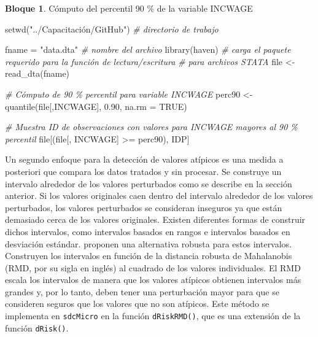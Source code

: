 \documentclass[
]{book}
\newenvironment{Shaded}{\begin{snugshade}}{\end{snugshade}}
\newcommand{\AttributeTok}[1]{\textcolor[rgb]{0.77,0.63,0.00}{#1}}
\newcommand{\CommentTok}[1]{\textcolor[rgb]{0.56,0.35,0.01}{\textit{#1}}}
\newcommand{\ConstantTok}[1]{\textcolor[rgb]{0.00,0.00,0.00}{#1}}
\newcommand{\FloatTok}[1]{\textcolor[rgb]{0.00,0.00,0.81}{#1}}
\newcommand{\FunctionTok}[1]{\textcolor[rgb]{0.00,0.00,0.00}{#1}}
\newcommand{\NormalTok}[1]{#1}
\newcommand{\OtherTok}[1]{\textcolor[rgb]{0.56,0.35,0.01}{#1}}
\newcommand{\SpecialCharTok}[1]{\textcolor[rgb]{0.00,0.00,0.00}{#1}}
\newcommand{\StringTok}[1]{\textcolor[rgb]{0.31,0.60,0.02}{#1}}
\theoremstyle{definition}
\theoremstyle{definition}
\newtheorem{example}{Bloque}[chapter]
\theoremstyle{definition}
\theoremstyle{definition}
\theoremstyle{remark}
\begin{document}
\begin{example}
\protect\hypertarget{exm:bloqueMR8}{}\label{exm:bloqueMR8}Cómputo del percentil 90 \% de la variable INCWAGE
\end{example}

\begin{Shaded}
\begin{Highlighting}[]
\FunctionTok{setwd}\NormalTok{(}\StringTok{"../Capacitación/GitHub"}\NormalTok{) }\CommentTok{\# directorio de trabajo}

\NormalTok{fname }\OtherTok{=} \StringTok{"data.dta"} \CommentTok{\# nombre del archivo}
\FunctionTok{library}\NormalTok{(haven) }\CommentTok{\# carga el paquete requerido para la función de lectura/escritura}
               \CommentTok{\# para archivos STATA}
\NormalTok{file }\OtherTok{\textless{}{-}} \FunctionTok{read\_dta}\NormalTok{(fname) }

\CommentTok{\# Cómputo de 90 \% percentil para variable INCWAGE}
\NormalTok{ perc90 }\OtherTok{\textless{}{-}} \FunctionTok{quantile}\NormalTok{(file[,}\StringTok{\textquotesingle{}INCWAGE\textquotesingle{}}\NormalTok{], }\FloatTok{0.90}\NormalTok{, }\AttributeTok{na.rm =} \ConstantTok{TRUE}\NormalTok{)}

 \CommentTok{\# Muestra ID de observaciones con valores para INCWAGE mayores al 90 \% percentil}
\NormalTok{ file[(file[, }\StringTok{\textquotesingle{}INCWAGE\textquotesingle{}}\NormalTok{] }\SpecialCharTok{\textgreater{}=}\NormalTok{ perc90), }\StringTok{\textquotesingle{}IDP\textquotesingle{}}\NormalTok{]}
\end{Highlighting}
\end{Shaded}

Un segundo enfoque para la detección de valores atípicos es una medida a posteriori que compara los datos tratados y sin procesar. Se construye un intervalo alrededor de los valores perturbados como se describe en la sección anterior. Si los valores originales caen dentro del intervalo alrededor de los valores perturbados, los valores perturbados se consideran inseguros ya que están demasiado cerca de los valores originales. Existen diferentes formas de construir dichos intervalos, como intervalos basados en rangos e intervalos basados en desviación estándar. \citet{templ2008} proponen una alternativa robusta para estos intervalos. Construyen los intervalos en función de la distancia robusta de Mahalanobis (RMD, por su sigla en inglés) al cuadrado de los valores individuales. El RMD escala los intervalos de manera que los valores atípicos obtienen intervalos más grandes y, por lo tanto, deben tener una perturbación mayor para que se consideren seguros que los valores que no son atípicos. Este método se implementa en \texttt{sdcMicro} en la función \texttt{dRiskRMD()}, que es una extensión de la función \texttt{dRisk()}.
\end{document}
